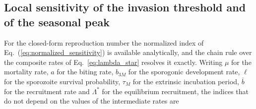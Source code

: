 \documentclass[a4paper,fleqn]{cas-dc}
\begin{document}
\subsection{Local sensitivity of the invasion threshold and of the seasonal peak}
\label{sec:results_sensitivity}

For the closed-form reproduction number the normalized index of
Eq.~(\ref{eq:normalized_sensitivity}) is available analytically, and the
chain rule over the composite rates of Eq.~\ref{eq:lambda_star} resolves it
exactly. Writing $\mu$ for the mortality rate, $a$ for the biting rate,
$b_{3M}$ for the sporogonic development rate, $\ell$ for the sporozoite
survival probability, $\tau_M$ for the extrinsic incubation period,
$\bar{b}$ for the recruitment rate and $\Lambda^*$ for the equilibrium
recruitment, the indices that do not depend on the values of the
intermediate rates are
\end{document}
